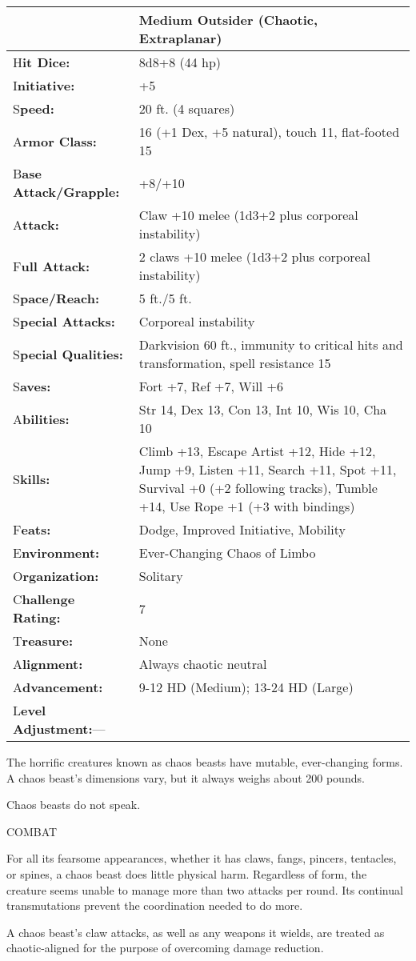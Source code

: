 \documentclass{article}
\begin{document}
\begin{tabular}{|>{\raggedright}p{91pt}|>{\raggedright}p{202pt}|}
\hline
  & Medium Outsider (Chaotic, Extraplanar)\tabularnewline
\hline
H\textbf{it Dice:} & 8d8+8 (44 hp)\tabularnewline
\hline
I\textbf{nitiative:} & +5\tabularnewline
\hline
S\textbf{peed:} & 20 ft. (4 squares)\tabularnewline
\hline
A\textbf{rmor Class:} & 16 (+1 Dex, +5 natural), touch 11, flat-footed 15\tabularnewline
\hline
B\textbf{ase Attack/Grapple:} & +8/+10\tabularnewline
\hline
A\textbf{ttack:} & Claw +10 melee (1d3+2 plus corporeal instability)\tabularnewline
\hline
F\textbf{ull Attack:} & 2 claws +10 melee (1d3+2 plus corporeal instability)\tabularnewline
\hline
S\textbf{pace/Reach:} & 5 ft./5 ft.\tabularnewline
\hline
S\textbf{pecial Attacks:} & Corporeal instability\tabularnewline
\hline
S\textbf{pecial Qualities:} & Darkvision 60 ft., immunity to critical hits and 
transformation, spell resistance 15\tabularnewline
\hline
S\textbf{aves:} & Fort +7, Ref +7, Will +6\tabularnewline
\hline
A\textbf{bilities:} & Str 14, Dex 13, Con 13, Int 10, Wis 10, Cha 10\tabularnewline
\hline
S\textbf{kills:} & Climb +13, Escape Artist +12, Hide +12, Jump +9, Listen +11, 
Search +11, Spot +11, Survival +0 (+2 following tracks), Tumble +14, Use Rope +1 
(+3 with bindings)\tabularnewline
\hline
F\textbf{eats:} & Dodge, Improved Initiative, Mobility\tabularnewline
\hline
E\textbf{nvironment:} & Ever-Changing Chaos of Limbo\tabularnewline
\hline
O\textbf{rganization:} & Solitary\tabularnewline
\hline
C\textbf{hallenge Rating:} & 7\tabularnewline
\hline
T\textbf{reasure:} & None\tabularnewline
\hline
A\textbf{lignment:} & Always chaotic neutral\tabularnewline
\hline
A\textbf{dvancement:} & 9-12 HD (Medium); 13-24 HD (Large)\tabularnewline
\hline
L\textbf{evel Adjustment:}--- & \tabularnewline
\hline
\end{tabular}

The horrific creatures known as chaos beasts have mutable, ever-changing forms. 
A chaos beast's dimensions vary, but it always weighs about 200 pounds.

Chaos beasts do not speak.

COMBAT

For all its fearsome appearances, whether it has claws, fangs, pincers, tentacles, 
or spines, a chaos beast does little physical harm. Regardless of form, the creature 
seems unable to manage more than two attacks per round. Its continual transmutations 
prevent the coordination needed to do more.

A chaos beast's claw attacks, as well as any weapons it wields, are treated as 
chaotic-aligned for the purpose of overcoming damage reduction.
\end{document}
